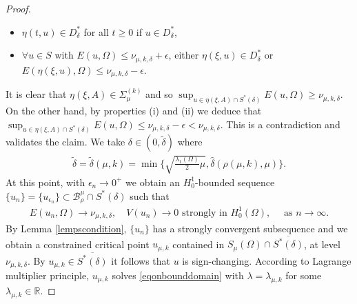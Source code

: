 \documentclass[10pt,a4paper]{article}
\theoremstyle{definition} \theoremstyle{remark}
\numberwithin{equation}{section}
\newcommand{\R}{\mathbb{R}}
\newcommand{\B}{\mathcal{B}}
\newcommand{\la}{\lambda}
\newcommand{\ep}{\epsilon}
\begin{document}
\begin{proof}
    \begin{itemize}
    	\item[(i)] $\eta(t,u) \in D_\delta^*$ for all $t \geq 0$ if $u \in D_\delta^*$,
    	\item[(ii)] $\forall u \in S$ with $E(u,\Omega) \leq \nu_{\mu,k,\delta} + \epsilon$, either $\eta(\xi,u) \in D_\delta^*$ or $E(\eta(\xi,u),\Omega) \leq \nu_{\mu,k,\delta} -\epsilon$.
    \end{itemize}
    It is clear that $\eta(\xi,A) \in \Sigma_{\mu}^{(k)}$ and so $\sup_{u \in \eta(\xi,A) \cap S^*(\delta)}E(u,\Omega) \geq \nu_{\mu,k,\delta}$. On the other hand, by properties (i) and (ii) we deduce that $\sup_{u \in \eta(\xi,A) \cap S^*(\delta)}E(u,\Omega) \leq \nu_{\mu,k,\delta} - \ep < \nu_{\mu,k,\delta}$. This is a contradiction and validates the claim. We take $\delta \in (0,\tilde \delta)$ where
    \begin{align*}
    	\tilde \delta = \tilde \delta(\mu,k) = \min\biggl\{\sqrt{\frac{\la_1(\Omega)}{2}\mu},\hat \delta(\rho(\mu,k),\mu)\biggr\}.
    \end{align*}
    At this point, with $\ep_n \to 0^+$ we obtain an $H_0^1$-bounded sequence $\{u_n\} = \{u_{\ep_n}\} \subset \B_{\rho}^\mu \cap S^*(\delta)$ such that
    \begin{align} \label{eqpssequencesub}
    	E(u_n,\Omega) \to \nu_{\mu,k,\delta}, \quad V(u_n) \to 0 \text{ strongly in } H_0^1(\Omega), \quad \text{ as } n \to \infty.
    \end{align}
    By Lemma \ref{lempscondition}, $\{u_n\}$ has a strongly convergent subsequence and we obtain a constrained critical point $u_{\mu,k}$ contained in $S_\mu(\Omega) \cap \overline{S^*(\delta)}$, at level $\nu_{\mu,k,\delta}$. By $u_{\mu,k} \in \overline{S^*(\delta)}$ it follows that $u$ is sign-changing. According to Lagrange multiplier principle, $u_{\mu,k}$ solves \eqref{eqonbounddomain} with $\la = \la_{\mu,k}$ for some $\la_{\mu,k} \in \R$.


\end{proof}
\end{document}
